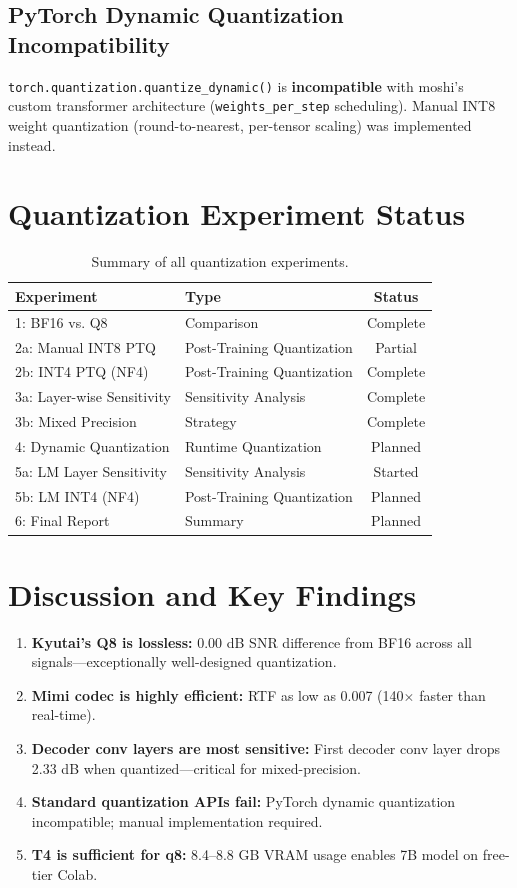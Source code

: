 \documentclass[11pt]{article}
\begin{document}
\subsection{PyTorch Dynamic Quantization Incompatibility}
\texttt{torch.quantization.quantize\_dynamic()} is \textbf{incompatible} with moshi's custom transformer architecture (\texttt{weights\_per\_step} scheduling). Manual INT8 weight quantization (round-to-nearest, per-tensor scaling) was implemented instead.

\section{Quantization Experiment Status}
\begin{table}[H]
\centering
\caption{Summary of all quantization experiments.}
\label{tab:exp_status}
\begin{tabular}{@{}llc@{}}
\toprule
\textbf{Experiment} & \textbf{Type} & \textbf{Status} \\
\midrule
1: BF16 vs. Q8 & Comparison & Complete \\
2a: Manual INT8 PTQ & Post-Training Quantization & Partial \\
2b: INT4 PTQ (NF4) & Post-Training Quantization & Complete \\
3a: Layer-wise Sensitivity & Sensitivity Analysis & Complete \\
3b: Mixed Precision & Strategy & Complete \\
4: Dynamic Quantization & Runtime Quantization & Planned \\
5a: LM Layer Sensitivity & Sensitivity Analysis & Started \\
5b: LM INT4 (NF4) & Post-Training Quantization & Planned \\
6: Final Report & Summary & Planned \\
\bottomrule
\end{tabular}
\end{table}

\section{Discussion and Key Findings}
\begin{enumerate}[noitemsep,topsep=2pt]
    \item \textbf{Kyutai's Q8 is lossless:} 0.00 dB SNR difference from BF16 across all signals---exceptionally well-designed quantization.
    \item \textbf{Mimi codec is highly efficient:} RTF as low as 0.007 (140$\times$ faster than real-time).
    \item \textbf{Decoder conv layers are most sensitive:} First decoder conv layer drops 2.33 dB when quantized---critical for mixed-precision.
    \item \textbf{Standard quantization APIs fail:} PyTorch dynamic quantization incompatible; manual implementation required.
    \item \textbf{T4 is sufficient for q8:} 8.4--8.8 GB VRAM usage enables 7B model on free-tier Colab.
\end{enumerate}
\end{document}
